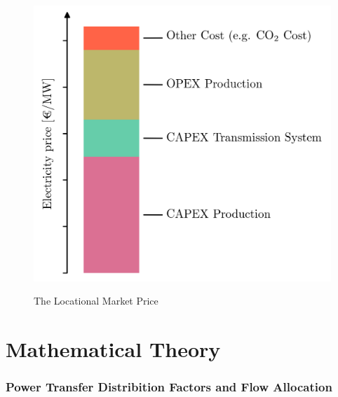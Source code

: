 \documentclass[11pt,twocolumn]{article}
\begin{document}
\begin{figure}[h]
 \includegraphics[width=\linewidth]{figures/price_decomposition.png}
 \label{fig:price_decomposition}
 \caption{The Locational Market Price}
\end{figure}



\section{Mathematical Theory}





\subsubsection*{Power Transfer Distribition Factors and Flow Allocation}
\end{document}
